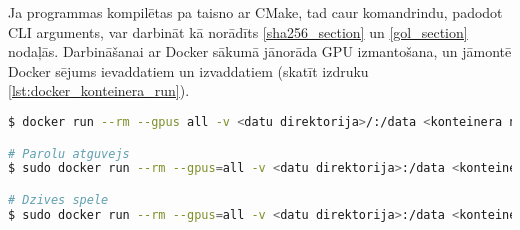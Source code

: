 Ja programmas kompilētas pa taisno ar CMake, tad caur komandrindu, padodot CLI
arguments, var darbināt kā norādīts \ref{sha256_section} un \ref{gol_section}
nodaļās. Darbināšanai ar Docker sākumā jānorāda  GPU izmantošana, un jāmontē
Docker sējums ievaddatiem un izvaddatiem (skatīt izdruku
\ref{lst:docker_konteinera_run}).

\begin{lstlisting}[caption={Docker konteinera darbināšanas konfigurācija},
  label=lst:docker_konteinera_run,
  captionpos=t,
  language=bash
]
$ docker run --rm --gpus all -v <datu direktorija>/:/data <konteinera nosaukums> /data/<apstradajamais fails> /data/<izvada fails> <citas opcijas ...>

# Parolu atguvejs 
$ sudo docker run --rm --gpus=all -v <datu direktorija>:/data <konteinera nosaukums> /data/<parolu faila cels> /data/<paroles hash vertiba> /data<zurnalfaila cels> /data/<zurnafails>

# Dzives spele 
$ sudo docker run --rm --gpus=all -v <datu direktorija>:/data <konteinera nosaukums> /data/<ieejas rezga faila cels> /data/<izejas rezga faila cels> /data<automata solu skaits> <zurnalfaila cels> 
\end{lstlisting}
